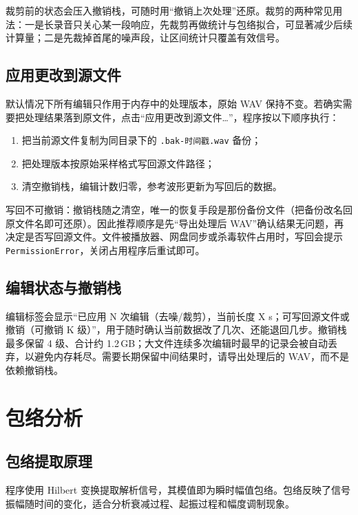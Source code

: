 \documentclass[UTF8,a4paper,12pt,scheme=chinese]{ctexart}
\begin{document}
裁剪前的状态会压入撤销栈，可随时用“撤销上次处理”还原。裁剪的两种常见用法：一是长录音只关心某一段响应，先裁剪再做统计与包络拟合，可显著减少后续计算量；二是先裁掉首尾的噪声段，让区间统计只覆盖有效信号。

\subsection{应用更改到源文件}

默认情况下所有编辑只作用于内存中的处理版本，原始 WAV 保持不变。若确实需要把处理结果落到原文件，点击“应用更改到源文件…”，程序按以下顺序执行：

\begin{enumerate}
  \item 把当前源文件复制为同目录下的 \texttt{.bak-时间戳.wav} 备份；
  \item 把处理版本按原始采样格式写回源文件路径；
  \item 清空撤销栈，编辑计数归零，参考波形更新为写回后的数据。
\end{enumerate}

写回不可撤销：撤销栈随之清空，唯一的恢复手段是那份备份文件（把备份改名回原文件名即可还原）。因此推荐顺序是先“导出处理后 WAV”确认结果无问题，再决定是否写回源文件。文件被播放器、网盘同步或杀毒软件占用时，写回会提示 \texttt{PermissionError}，关闭占用程序后重试即可。

\subsection{编辑状态与撤销栈}

编辑标签会显示“已应用 N 次编辑（去噪/裁剪），当前长度 X s；可写回源文件或撤销（可撤销 K 级）”，用于随时确认当前数据改了几次、还能退回几步。撤销栈最多保留 4 级、合计约 1.2\,GB；大文件连续多次编辑时最早的记录会被自动丢弃，以避免内存耗尽。需要长期保留中间结果时，请导出处理后的 WAV，而不是依赖撤销栈。

\section{包络分析}

\subsection{包络提取原理}

程序使用 Hilbert 变换提取解析信号，其模值即为瞬时幅值包络。包络反映了信号振幅随时间的变化，适合分析衰减过程、起振过程和幅度调制现象。
\end{document}
